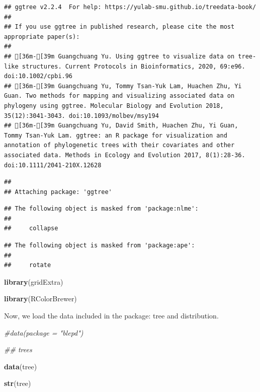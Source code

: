 \documentclass[]{article}
\newenvironment{Shaded}{\begin{snugshade}}{\end{snugshade}}
\newcommand{\CommentTok}[1]{\textcolor[rgb]{0.56,0.35,0.01}{\textit{#1}}}
\newcommand{\KeywordTok}[1]{\textcolor[rgb]{0.13,0.29,0.53}{\textbf{#1}}}
\newcommand{\NormalTok}[1]{#1}
\begin{document}
\begin{verbatim}
## ggtree v2.2.4  For help: https://yulab-smu.github.io/treedata-book/
## 
## If you use ggtree in published research, please cite the most appropriate paper(s):
## 
## [36m-[39m Guangchuang Yu. Using ggtree to visualize data on tree-like structures. Current Protocols in Bioinformatics, 2020, 69:e96. doi:10.1002/cpbi.96
## [36m-[39m Guangchuang Yu, Tommy Tsan-Yuk Lam, Huachen Zhu, Yi Guan. Two methods for mapping and visualizing associated data on phylogeny using ggtree. Molecular Biology and Evolution 2018, 35(12):3041-3043. doi:10.1093/molbev/msy194
## [36m-[39m Guangchuang Yu, David Smith, Huachen Zhu, Yi Guan, Tommy Tsan-Yuk Lam. ggtree: an R package for visualization and annotation of phylogenetic trees with their covariates and other associated data. Methods in Ecology and Evolution 2017, 8(1):28-36. doi:10.1111/2041-210X.12628
\end{verbatim}

\begin{verbatim}
## 
## Attaching package: 'ggtree'
\end{verbatim}

\begin{verbatim}
## The following object is masked from 'package:nlme':
## 
##     collapse
\end{verbatim}

\begin{verbatim}
## The following object is masked from 'package:ape':
## 
##     rotate
\end{verbatim}

\begin{Shaded}
\begin{Highlighting}[]
\KeywordTok{library}\NormalTok{(gridExtra)}

\KeywordTok{library}\NormalTok{(RColorBrewer)}
\end{Highlighting}
\end{Shaded}

Now, we load the data included in the package: tree and distribution.

\begin{Shaded}
\begin{Highlighting}[]
\CommentTok{#data(package = "blepd")}

\CommentTok{## trees}

\KeywordTok{data}\NormalTok{(tree)}

\KeywordTok{str}\NormalTok{(tree)}
\end{Highlighting}
\end{Shaded}
\end{document}
